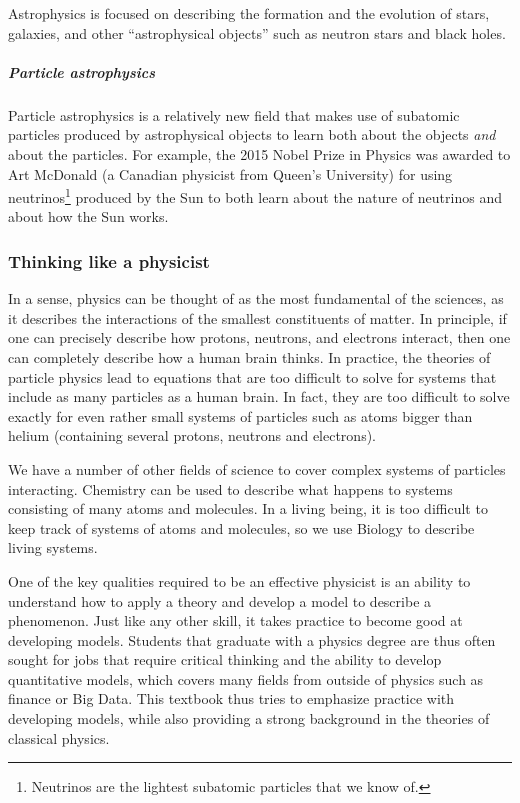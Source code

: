 Astrophysics is focused on describing the formation and the evolution of stars, galaxies, and other ``astrophysical objects'' such as neutron stars and black holes.

\subparagraph{Particle astrophysics}

Particle astrophysics is a relatively new field that makes use of subatomic particles produced by astrophysical objects to learn both about the objects \textit{and} about the particles. For example, the 2015 Nobel Prize in Physics was awarded to Art McDonald (a Canadian physicist from Queen's University) for using neutrinos\footnote{Neutrinos are the lightest subatomic particles that we know of.} produced by the Sun to both learn about the nature of neutrinos and about how the Sun works.

\subsubsection{Thinking like a physicist}

In a sense, physics can be thought of as the most fundamental of the sciences, as it describes the interactions of the smallest constituents of matter. In principle, if one can precisely describe how protons, neutrons, and electrons interact, then one can completely describe how a human brain thinks. In practice, the theories of particle physics lead to equations that are too difficult to solve for systems that include as many particles as a human brain. In fact, they are too difficult to solve exactly for even rather small systems of particles such as atoms bigger than helium (containing several protons, neutrons and electrons).

We have a number of other fields of science to cover complex systems of particles interacting. Chemistry can be used to describe what happens to systems consisting of many atoms and molecules. In a living being, it is too difficult to keep track of systems of atoms and molecules, so we use Biology to describe living systems.

One of the key qualities required to be an effective physicist is an ability to understand how to apply a theory and develop a model to describe a phenomenon. Just like any other skill, it takes practice to become good at developing models. Students that graduate with a physics degree are thus often sought for jobs that require critical thinking and the ability to develop quantitative models, which covers many fields from outside of physics such as finance or Big Data. This textbook thus tries to emphasize practice with developing models, while also providing a strong background in the theories of classical physics.

